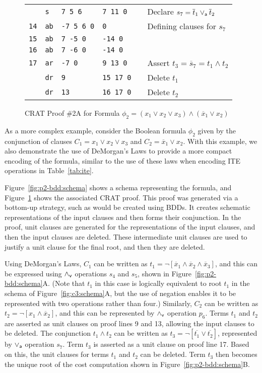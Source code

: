 \documentclass{llncs}
\newcommand{\pand}{\mathbin{\land_{\sf v}}}
\newcommand{\por}{\mathbin{\lor_{\sf a}}}
\newcommand{\obar}[1]{\overline{#1}}
\begin{document}
\begin{figure}
{\begin{tabular}{llllll}
            & {\tt s}   & {\tt 7 5 6}   & {\tt 7 11 0}  & & Declare $s_7 = \obar{t}_1 \por \obar{t}_2$ \\
    {\tt 14} & {\tt ab}  & {\tt -7 5 6 0}  & {\tt 0}    & & Defining clauses for $s_7$ \\ 
    {\tt 15} & {\tt ab}  & {\tt  7 -5 0}    & {\tt -14 0} &  \\  
    {\tt 16} & {\tt ab}  & {\tt  7 -6 0}    & {\tt -14 0} & &  \\
    {\tt 17} & {\tt ar}  & {\tt -7 0}       & {\tt 9 13 0} & & Assert $t_3 = \obar{s}_7 = t_1 \land t_2$ \\
             & {\tt dr}  & {\tt 9}          & {\tt 15 17 0} & & Delete $t_1$\\
             & {\tt dr}  & {\tt 13}         & {\tt 16 17 0} & & Delete $t_2$\\
  \end{tabular}
}  
  \caption{CRAT Proof \#2A for Formula $\phi_2 = (x_1 \lor x_2 \lor x_3) \land (\obar{x}_1 \lor x_2)$}
  \label{fig:p2-bdd:crat}
\end{figure}

As a more complex example, consider the Boolean formula $\phi_2$ given
by the conjunction of clauses $C_1 = x_1 \lor x_2 \lor x_3$ and $C_2 =
\obar{x}_1 \lor x_2$.  With this example, we also demonstrate the use
of DeMorgan's Laws to provide a more compact encoding of the formula,
similar to the use of these laws when encoding ITE operations in
Table~\ref{tab:ite}.

Figure~\ref{fig:p2-bdd:schema} shows a schema representing the formula,
and Figure~\ref{fig:p2-bdd:crat} shows the associated CRAT proof.  This
proof was generated via a bottom-up strategy, such as would be created
using BDDs.  It creates schematic representations of the input
clauses and then forms their conjunction.  In the proof, unit
clauses are generated for the representations of the input clauses,
and then the input clauses are deleted.  These intermediate unit
clauses are used to justify a unit clause for the final root, and then
they are deleted.

Using DeMorgan's Laws, $C_1$ can be written as 
$t_1 = \neg [\obar{x}_1\land \obar{x}_2\land \obar{x}_3]$, and this can be
expressed using $\pand$ operations $s_4$ and $s_5$, shown in
Figure~\ref{fig:p2-bdd:schema}A\@.  (Note that $t_1$ in this case is
logically equivalent to root $t_1$ in the schema of
Figure~\ref{fig:c3:schema}A, but the use of negation enables it to be
represented with two operations rather than four.)  Similarly, $C_2$
can be written as $t_2 = \neg [x_1\land \obar{x}_2]$, and this can be
represented by $\pand$ operation $p_6$.
Terms $t_1$ and $t_2$ are asserted as unit clauses on proof lines 9 and 13,
allowing the input clauses to be deleted.
The conjunction $t_1 \land t_2$
can be written as $t_3 = \neg[\obar{t_1} \lor \obar{t_2}]$, represented by $\por$ operation $s_7$.
Term $t_3$ is asserted as a unit clause on proof line 17.
Based on this, the unit clauses for terms $t_1$ and
$t_2$ can be deleted.  Term $t_3$ then becomes the unique root of the cost
computation shown in Figure~\ref{fig:p2-bdd:schema}B\@.
\end{document}
